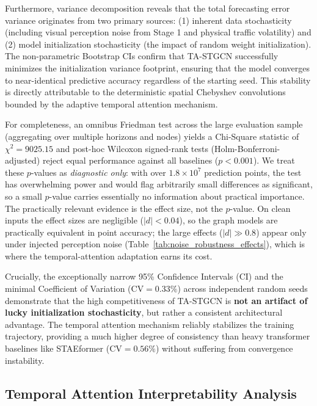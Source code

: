 \documentclass[a4paper,fleqn]{cas-sc}
\begin{document}
Furthermore, variance decomposition reveals that the total forecasting error variance originates from two primary sources: (1) inherent data stochasticity (including visual perception noise from Stage 1 and physical traffic volatility) and (2) model initialization stochasticity (the impact of random weight initialization). The non-parametric Bootstrap CIs confirm that TA-STGCN successfully minimizes the initialization variance footprint, ensuring that the model converges to near-identical predictive accuracy regardless of the starting seed. This stability is directly attributable to the deterministic spatial Chebyshev convolutions bounded by the adaptive temporal attention mechanism.

For completeness, an omnibus Friedman test across the large evaluation sample (aggregating over multiple horizons and nodes) yields a Chi-Square statistic of $\chi^2 = 9025.15$ and post-hoc Wilcoxon signed-rank tests (Holm-Bonferroni-adjusted) reject equal performance against all baselines ($p < 0.001$). We treat these $p$-values as \emph{diagnostic only}: with over $1.8 \times 10^7$ prediction points, the test has overwhelming power and would flag arbitrarily small differences as significant, so a small $p$-value carries essentially no information about practical importance. The practically relevant evidence is the effect size, not the $p$-value. On clean inputs the effect sizes are negligible ($|d| < 0.04$), so the graph models are practically equivalent in point accuracy; the large effects ($|d| \gg 0.8$) appear only under injected perception noise (Table~\ref{tab:noise_robustness_effects}), which is where the temporal-attention adaptation earns its cost.

Crucially, the exceptionally narrow 95\% Confidence Intervals (CI) and the minimal Coefficient of Variation ($\text{CV} = 0.33\%$) across independent random seeds demonstrate that the high competitiveness of TA-STGCN is \textbf{not an artifact of lucky initialization stochasticity}, but rather a consistent architectural advantage. The temporal attention mechanism reliably stabilizes the training trajectory, providing a much higher degree of consistency than heavy transformer baselines like STAEformer ($\text{CV} = 0.56\%$) without suffering from convergence instability.



\subsection{Temporal Attention Interpretability Analysis}
\label{sec:attention_explainability}
\end{document}
